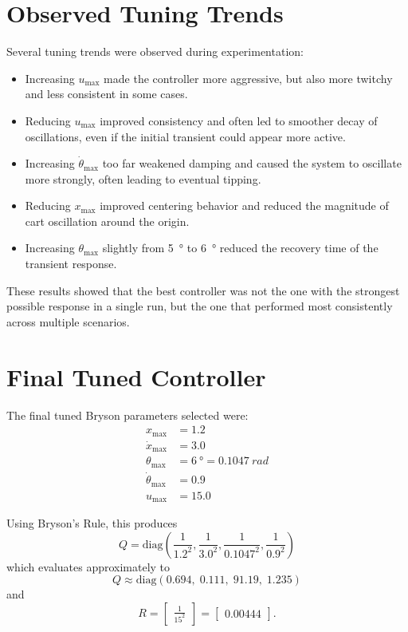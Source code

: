 \documentclass[11pt]{article}
\begin{document}
\newpage
\section{Observed Tuning Trends}
Several tuning trends were observed during experimentation:
\begin{itemize}[itemsep=2pt]
    \item Increasing $u_{\max}$ made the controller more aggressive, but also more twitchy and less consistent in some cases.
    \item Reducing $u_{\max}$ improved consistency and often led to smoother decay of oscillations, even if the initial transient could appear more active.
    \item Increasing $\dot{\theta}_{\max}$ too far weakened damping and caused the system to oscillate more strongly, often leading to eventual tipping.
    \item Reducing $x_{\max}$ improved centering behavior and reduced the magnitude of cart oscillation around the origin.
    \item Increasing $\theta_{\max}$ slightly from \SI{5}{\degree} to \SI{6}{\degree} reduced the recovery time of the transient response.
\end{itemize}

These results showed that the best controller was not the one with the strongest possible response in a single run, but the one that performed most consistently across multiple scenarios.

\section{Final Tuned Controller}
The final tuned Bryson parameters selected were:
\begin{align}
    x_{\max} &= 1.2 \\
    \dot{x}_{\max} &= 3.0 \\
    \theta_{\max} &= \SI{6}{\degree} = \SI{0.1047}{rad} \\
    \dot{\theta}_{\max} &= 0.9 \\
    u_{\max} &= 15.0
\end{align}

Using Bryson's Rule, this produces
\begin{equation}
Q = \mathrm{diag}\left(
\frac{1}{1.2^2},
\frac{1}{3.0^2},
\frac{1}{0.1047^2},
\frac{1}{0.9^2}
\right)
\end{equation}
which evaluates approximately to
\begin{equation}
Q \approx \mathrm{diag}(0.694,\;0.111,\;91.19,\;1.235)
\end{equation}
and
\begin{equation}
R =
\begin{bmatrix}
\frac{1}{15^2}
\end{bmatrix}
=
\begin{bmatrix}
0.00444
\end{bmatrix}.
\end{equation}
\end{document}
